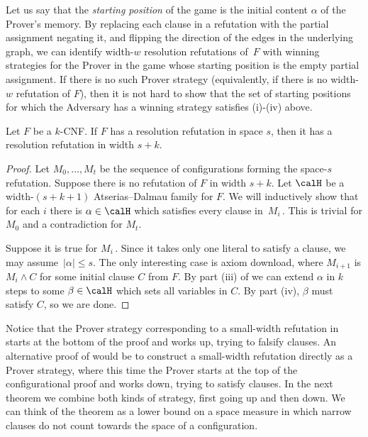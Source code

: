 Let us say that the \emph{starting position} of the game is
the initial content $\alpha$ of the Prover's memory.
By replacing each clause in a refutation
with the partial assignment negating it, and flipping the 
direction of the edges in the underlying graph,
we can identify width-$w$ resolution refutations of~$F$ with winning strategies for the Prover in the game whose starting position is the empty partial assignment. 
If there is no such Prover strategy (equivalently, if there is 
no width-$w$ refutation of $F$), then it is not 
hard to show that the set of starting positions for
which the Adversary has a winning strategy 
satisfies (i)-(iv) above.




\begin{theorem}  \label{lem:width_space_resolution}
Let $F$ be a $k$-CNF. If $F$ has a resolution refutation in space $s$, 
then it has a resolution refutation in width $s+k$.
\end{theorem}

\begin{proof}
Let $M_0, \dots, M_t$ be the sequence of configurations forming the 
space-$s$ refutation. 
Suppose there is no refutation of $F$ in width $s+k$. Let $\calH$ be a 
width-$(s+k+1)$ Atserias--Dalmau family for $F$.
We will inductively show that for each $i$ there is $\alpha \in \calH$ 
which satisfies every clause in~$M_i$\,. This is trivial for $M_0$ and a contradiction for $M_t$.

Suppose it is true for $M_i$\,. Since it takes only one literal to satisfy a clause,
we may assume~$|\alpha| \le s$. The only interesting case is axiom download,
where $M_{i+1}$ is $M_i \wedge C$ for some initial clause $C$ from $F$.
By part (iii) of  we can extend $\alpha$ in $k$
steps to some $\beta \in \calH$ which sets all variables in $C$.
By part (iv), $\beta$ must satisfy $C$, so we are done. 
\end{proof}

Notice that the Prover strategy corresponding to a small-width refutation
in 
starts at the bottom of the proof and works up, trying to falsify
clauses.
An alternative proof of 
would be to construct a small-width refutation directly as a Prover strategy, where this time
the Prover starts at the top of the configurational proof and works down, trying to
satisfy clauses. In the next theorem we combine both kinds of strategy, first going up and then down.
We can think of the theorem as a lower bound on a space measure
in which narrow clauses do not count towards the space of a configuration.


